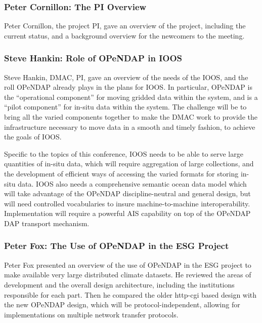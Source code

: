 
\subsubsection{Peter Cornillon: The \ac{PI} Overview}

Peter Cornillon, the project \ac{PI}, gave an overview of the project,
including the current status, and a background overview for the
newcomers to the meeting.

\subsubsection{Steve Hankin:  Role of \ac{OPeNDAP} in \ac{IOOS}}

Steve Hankin, \ac{DMAC}, \ac{PI}, gave an overview of the needs of the
\ac{IOOS}, and the roll \ac{OPeNDAP} already plays in the plans for
\ac{IOOS}.  In particular, \ac{OPeNDAP} is the ``operational
component'' for moving gridded data within the system, and is a
``pilot component'' for in-situ data within the system.  The challenge
will be to bring all the varied components together to make the
\ac{DMAC} work to provide the infrastructure necessary to move data in
a smooth and timely fashion, to achieve the goals of IOOS.

Specific to the topics of this conference, IOOS needs to
be able to serve large quantities of in-situ data, which will
require aggregation of large collections, and the development of
efficient ways of accessing the varied formats for storing in-situ
data.  IOOS also needs a comprehensive semantic ocean data model
which will take advantage of the OPeNDAP discipline-neutral and
general design, but will need controlled vocabularies to insure
machine-to-machine interoperability.  Implementation will require
a powerful \ac{AIS} capability on top of the \ac{OPeNDAP} \ac{DAP} 
transport mechanism.

\subsubsection{Peter Fox:  The Use of \ac{OPeNDAP} in the \ac{ESG} Project}

Peter Fox presented an overview of the use of \ac{OPeNDAP} in the
\ac{ESG} project to make available very large distributed climate
datasets.  He reviewed the areas of development and the overall design
architecture, including the institutions responsible for each part.
Then he compared the older http-cgi based design with the new
\ac{OPeNDAP} design, which will be protocol-independent, allowing for
implementations on multiple network transfer protocols.

